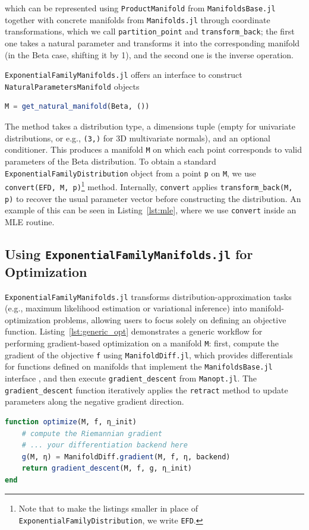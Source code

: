 \documentclass{juliacon}
\begin{document}
which can be represented using \texttt{ProductManifold} from \texttt{ManifoldsBase.jl} together with concrete manifolds from \texttt{Manifolds.jl} through coordinate transformations, which we call \texttt{partition\_point} and \texttt{transform\_back}; the first one takes a natural parameter and transforms it into the corresponding manifold (in the Beta case, shifting it by 1), and the second one is the inverse operation.

\texttt{ExponentialFamilyManifolds.jl} offers an interface to construct \texttt{NaturalParametersManifold} objects \begin{lstlisting}[language=Julia]
M = get_natural_manifold(Beta, ())
\end{lstlisting} The method takes a distribution type, a dimensions tuple (empty for univariate distributions, or e.g., \texttt{(3,)} for 3D multivariate normals), and an optional conditioner. This produces a manifold \texttt{M} on which each point corresponds to valid parameters of the Beta distribution. To obtain a standard \texttt{ExponentialFamilyDistribution} object from a point \texttt{p} on \texttt{M}, we use \texttt{convert(EFD, M, p)}\footnote{\label{foot-efd}Note that to make the listings smaller in place of \texttt{ExponentialFamilyDistribution}, we write \texttt{EFD}.} method. Internally, \texttt{convert} applies \texttt{transform\_back(M, p)} to recover the usual parameter vector before constructing the distribution. An example of this can be seen in Listing~\ref{lst:mle}, where we use \texttt{convert} inside an MLE routine.

\subsection{Using \texttt{ExponentialFamilyManifolds.jl} for Optimization} \label{sec:using_efm}

\texttt{ExponentialFamilyManifolds.jl} transforms distribution-approximation tasks 
(e.g., maximum likelihood estimation or variational inference) into manifold-optimization problems, 
allowing users to focus solely on defining an objective function. 
Listing~\ref{lst:generic_opt} demonstrates a generic workflow for performing gradient-based optimization on a manifold \texttt{M}: 
first, compute the gradient of the objective \texttt{f} using \texttt{ManifoldDiff.jl}, which provides differentials for functions defined on manifolds that implement the \texttt{ManifoldsBase.jl} interface \cite{axen_manifoldsjl_2023}, 
and then execute \texttt{gradient\_descent} from \texttt{Manopt.jl}. 
The \texttt{gradient\_descent} function iteratively applies the \texttt{retract} method to update parameters along the negative gradient direction.
\begin{lstlisting}[language=Julia, caption={Generic manifold-based optimization}, label={lst:generic_opt}]
function optimize(M, f, η_init)
    # compute the Riemannian gradient
    # ... your differentiation backend here
    g(M, η) = ManifoldDiff.gradient(M, f, η, backend)
    return gradient_descent(M, f, g, η_init)
end
\end{lstlisting}
\vspace{1em}
\end{document}
